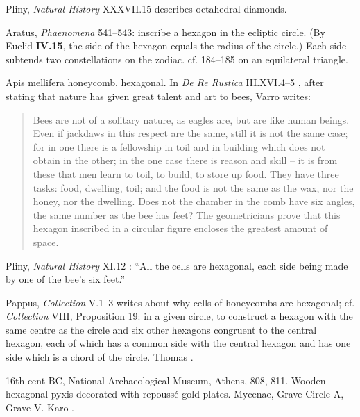 \documentclass{article}
\begin{document}
Pliny, {\em Natural History} XXXVII.15 \cite[p.~225]{LCL419} describes octahedral diamonds.






Aratus, {\em Phaenomena} 541--543: inscribe a hexagon in the ecliptic circle. (By Euclid \textbf{IV.15}, 
the side of the hexagon equals the radius of the circle.) Each side subtends two constellations on the zodiac. 
cf. 184--185 on an equilateral triangle.









Apis mellifera honeycomb, hexagonal. In {\em De Re Rustica} III.XVI.4--5 \cite[p.~501]{varro}, after stating that nature has given great talent and art to bees, Varro writes:
 
\begin{quote}
Bees are not of a solitary nature, as eagles are, but are like human beings. Even if jackdaws in this respect are the same, still it is not the same case; for in one there is a fellowship
in toil and in building which does not obtain in the other; in the one case there is reason and skill -- it is from these that men learn to toil, to build, to store up food. They have three 
tasks: food, dwelling, toil; and the food is not the same as the wax, nor the honey, nor the dwelling. Does not the chamber in the comb have six angles, the same number as the bee 
has feet? The geometricians prove that this hexagon inscribed in a circular figure encloses the greatest amount of space.
\end{quote}

Pliny, {\em Natural History} XI.12 \cite[p.~451]{LCL353}: ``All the cells are hexagonal, each side being made by one of the bee's six feet.''

Pappus, {\em Collection} V.1--3 \cite[pp.~389--390]{HGMII} writes about why cells of honeycombs are hexagonal; cf.
{\em Collection} VIII, Proposition 19: in a given circle, to construct a hexagon with the same centre as the circle and six other hexagons congruent to the central hexagon, 
each of which has a common side with the central hexagon and has one side which is a chord of the circle. Thomas \cite[pp.~588--593]{LCL362}.








16th cent BC, National Archaeological Museum, Athens, 808, 811. Wooden hexagonal pyxis decorated with repouss\'e gold plates. Mycenae, Grave Circle A, Grave V.
Karo \cite[p.~143]{karo}.
\end{document}
